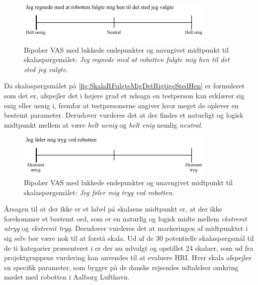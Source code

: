 %
\begin{figure}[H]
\centering
\includegraphics[width =\textwidth]{Figure/UdvalgteSkalaer/RobottenFulgteMigDetRigtigeStedHen} 
\caption{Bipolær VAS med lukkede endepunkter og navngivet midtpunkt til skalaspørgsmålet: \textit{Jeg regnede med at robotten fulgte mig hen til det sted jeg valgte}.}
\label{fig:SkalaRFulgteMigDetRigtigeStedHen}
\end{figure}
\noindent
%
Da skalaspørgsmålet på \autoref{fig:SkalaRFulgteMigDetRigtigeStedHen} er formuleret som det er, afspejler det i højere grad et udsagn en testperson kan erklærer sig enig eller uenig i, fremfor at testpersonerne angiver hvor meget de oplever en bestemt parameter. Derudover vurderes det at der findes et naturligt og logisk midtpunkt mellem at være \textit{helt uenig} og \textit{helt enig} nemlig \textit{neutral}.  
%
\begin{figure}[H]
\centering
\includegraphics[width =\textwidth]{Figure/UdvalgteSkalaer/TrygVedR} 
\caption{Bipolær VAS med lukkede endepunkter og unavngivet midtpunkt til skalaspørgsmålet: \textit{Jeg føler mig tryg ved robotten}.}
\label{fig:SkalaTrygVedR}
\end{figure}
\noindent
%
Årsagen til at der ikke er et label på skalaens midtpunkt er, at der ikke forekommer et bestemt ord, som er en naturlig og logisk midte mellem \textit{ekstremt utryg} og \textit{ekstremt tryg}. Derudover vurderes det at markeringen af midtpunktet i sig selv bør være nok til at forstå skala.\blankline
%
Ud af de 30 potentielle skalaspørgsmål til de ti kategorier præsenteret i  er der nu udvalgt og opstillet 24 skalaer, som ud fra projektgruppens vurdering kan anvendes til at evaluere HRI. Hver skala afspejler en specifik parameter, som bygger på de danske rejsendes udtalelser omkring mødet med robotten i Aalborg Lufthavn.     
